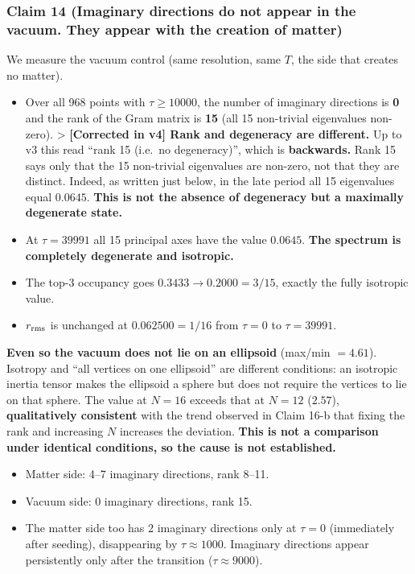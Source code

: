 \documentclass[
  10pt,
]{article}
\providecommand{\tightlist}{%
  \setlength{\itemsep}{0pt}\setlength{\parskip}{0pt}}
\begin{document}
\subsubsection{Claim 14 (Imaginary directions do not appear in the
vacuum. They appear with the creation of
matter)}\label{claim-14-imaginary-directions-do-not-appear-in-the-vacuum.-they-appear-with-the-creation-of-matter}

We measure the vacuum control (same resolution, same \(T\), the side
that creates no matter).

\begin{itemize}
\tightlist
\item
  Over all 968 points with \(\tau\ge10000\), the number of imaginary
  directions is \textbf{0} and the rank of the Gram matrix is
  \textbf{15} (all 15 non-trivial eigenvalues non-zero). \textgreater{}
  \textbf{{[}Corrected in v4{]} Rank and degeneracy are different.} Up
  to v3 this read ``rank 15 (i.e.~no degeneracy)'', which is
  \textbf{backwards.} Rank 15 says only that the 15 non-trivial
  eigenvalues are non-zero, not that they are distinct. Indeed, as
  written just below, in the late period all 15 eigenvalues equal
  \(0.0645\). \textbf{This is not the absence of degeneracy but a
  maximally degenerate state.}
\item
  At \(\tau=39991\) all 15 principal axes have the value \(0.0645\).
  \textbf{The spectrum is completely degenerate and isotropic.}
\item
  The top-3 occupancy goes \(0.3433 \to 0.2000 = 3/15\), exactly the
  fully isotropic value.
\item
  \(r_{\rm rms}\) is unchanged at \(0.062500 = 1/16\) from \(\tau=0\) to
  \(\tau=39991\).
\end{itemize}

\textbf{Even so the vacuum does not lie on an ellipsoid} (max/min
\(=4.61\)). Isotropy and ``all vertices on one ellipsoid'' are different
conditions: an isotropic inertia tensor makes the ellipsoid a sphere but
does not require the vertices to lie on that sphere. The value at
\(N=16\) exceeds that at \(N=12\) (\(2.57\)), \textbf{qualitatively
consistent} with the trend observed in Claim 16-b that fixing the rank
and increasing \(N\) increases the deviation. \textbf{This is not a
comparison under identical conditions, so the cause is not established.}

\begin{itemize}
\tightlist
\item
  Matter side: 4--7 imaginary directions, rank 8--11.
\item
  Vacuum side: 0 imaginary directions, rank 15.
\item
  The matter side too has 2 imaginary directions only at \(\tau=0\)
  (immediately after seeding), disappearing by \(\tau\approx1000\).
  Imaginary directions appear persistently only after the transition
  (\(\tau\approx9000\)).
\end{itemize}
\end{document}
